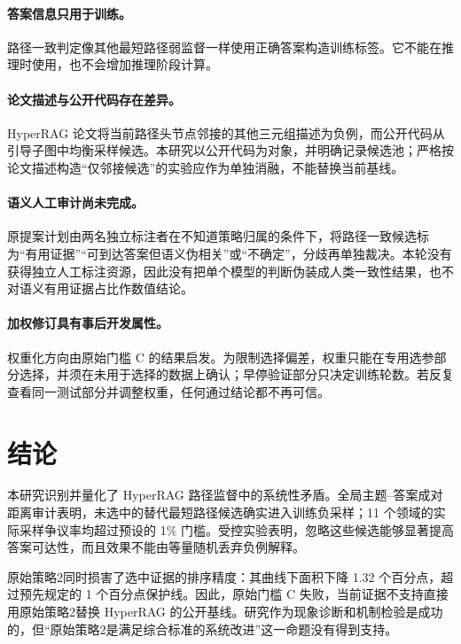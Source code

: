 \documentclass[UTF8,11pt]{ctexart}
\begin{document}
\paragraph{答案信息只用于训练。}
路径一致判定像其他最短路径弱监督一样使用正确答案构造训练标签。它不能在推理时使用，也不会增加推理阶段计算。

\paragraph{论文描述与公开代码存在差异。}
HyperRAG 论文将当前路径头节点邻接的其他三元组描述为负例，而公开代码从引导子图中均衡采样候选。本研究以公开代码为对象，并明确记录候选池；严格按论文描述构造“仅邻接候选”的实验应作为单独消融，不能替换当前基线。

\paragraph{语义人工审计尚未完成。}
原提案计划由两名独立标注者在不知道策略归属的条件下，将路径一致候选标为“有用证据”“可到达答案但语义伪相关”或“不确定”，分歧再单独裁决。本轮没有获得独立人工标注资源，因此没有把单个模型的判断伪装成人类一致性结果，也不对语义有用证据占比作数值结论。

\paragraph{加权修订具有事后开发属性。}
权重化方向由原始门槛 C 的结果启发。为限制选择偏差，权重只能在专用选参部分选择，并须在未用于选择的数据上确认；早停验证部分只决定训练轮数。若反复查看同一测试部分并调整权重，任何通过结论都不再可信。

\section{结论}

本研究识别并量化了 HyperRAG 路径监督中的系统性矛盾。全局主题--答案成对距离审计表明，未选中的替代最短路径候选确实进入训练负采样；11 个领域的实际采样争议率均超过预设的 1\% 门槛。受控实验表明，忽略这些候选能够显著提高答案可达性，而且效果不能由等量随机丢弃负例解释。

原始策略2同时损害了选中证据的排序精度：其曲线下面积下降 1.32 个百分点，超过预先规定的 1 个百分点保护线。因此，原始门槛 C 失败，当前证据不支持直接用原始策略2替换 HyperRAG 的公开基线。研究作为现象诊断和机制检验是成功的，但“原始策略2是满足综合标准的系统改进”这一命题没有得到支持。
\end{document}

